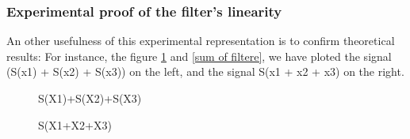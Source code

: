 \documentclass[a4paper,10pt]{article}
\begin{document}
	\subsubsection{Experimental proof of the filter's linearity}
	An other usefulness of this experimental representation is to confirm theoretical results:\newline
	For instance, the figure \ref{filtere of sum} and \ref{sum of filtere}, we have ploted the signal (S(x1) + S(x2) + S(x3)) on the left, and the signal S(x1 + x2 + x3) on the right.
	\begin{figure}[!htb]\centering
	  \begin{minipage}{0.45\textwidth}
	    \caption{S(X1)+S(X2)+S(X3)}\label{sum of filtere}
	  \end{minipage}
	  \begin{minipage}{0.45\textwidth}
	    \caption{S(X1+X2+X3)}\label{filtere of sum}
	  \end{minipage}
	\end{figure}
\end{document}
